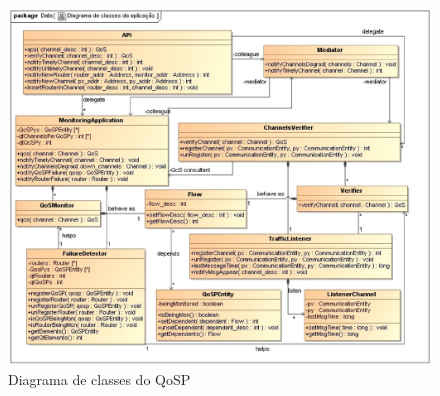 \begin{figure}
\centering
\includegraphics[scale=0.65]{diagrama_aplicacao}
\caption{Diagrama de classes do QoSP}
\label{fig:diagrama_classe_qosp}
\end{figure}	
	
